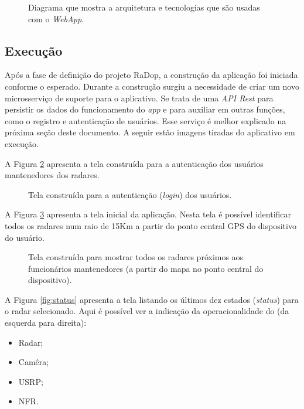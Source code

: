 \begin{figure}[H]
	\caption{\label{fig:diagrama-arq-webApp} Diagrama que mostra a arquitetura e tecnologias que são usadas com o \textit{WebApp}.}
\end{figure}

\subsection{Execução}

Após a fase de definição do projeto RaDop, a construção da aplicação foi iniciada conforme o esperado. Durante a construção surgiu a necessidade de criar um novo microsserviço de suporte para o aplicativo. Se trata de uma \textit{API Rest} para persistir os dados do funcionamento do \textit{app} e para auxiliar em outras funções, como o registro e autenticação de usuários. Esse serviço é melhor explicado na próxima seção deste documento. A seguir estão imagens tiradas do aplicativo em execução.

A Figura \ref{fig:app-sign-in} apresenta a tela construída para a autenticação dos usuários mantenedores dos radares.

\begin{figure}[H]
	\caption{\label{fig:app-sign-in} Tela construída para a autenticação (\textit{login}) dos usuários.}
\end{figure}

A Figura \ref{fig:app-tela-principal} apresenta a tela inicial da aplicação. Nesta tela é possível identificar todos os radares num raio de 15Km a partir do ponto central GPS do dispositivo do usuário.

\begin{figure}[H]
	\caption{\label{fig:app-tela-principal} Tela construída para mostrar todos os radares próximos aos funcionários mantenedores (a partir do mapa no ponto central do dispositivo).}
\end{figure}

A Figura \ref{fig:status} apresenta a tela listando os últimos dez estados (\textit{status}) para o radar selecionado. Aqui é possível ver a indicação da operacionalidade do (da esquerda para direita):
\begin{itemize}
    \item Radar;
    \item Camêra;
    \item USRP;
    \item NFR.
\end{itemize}

